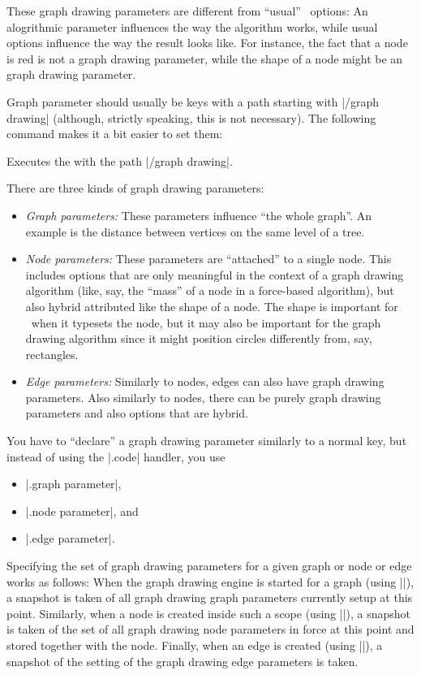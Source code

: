 These graph drawing parameters are different from ``usual'' \pgfname\
options: An alogrithmic parameter influences the way the algorithm
works, while usual options influence the way the result
looks like. For instance, the fact that a node is red is not a
graph drawing parameter, while the shape of a node might be an graph
drawing parameter. 

Graph parameter should usually be keys with a path starting with
|/graph drawing| (although, strictly speaking, this is not
necessary). The following command makes it a bit easier to set them:
\begin{command}{\pgfgdset\marg{options}}
  Executes the  with the path |/graph drawing|.  
\end{command}

There are three kinds of graph drawing parameters:

\begin{itemize}
\item \emph{Graph parameters:}
  These parameters influence ``the whole graph''. An example
  is the distance between vertices on the same level of a tree.
\item \emph{Node parameters:}
  These parameters are ``attached'' to a single node. This includes
  options that are only meaningful in the context of a graph
  drawing algorithm (like, say, the ``mass'' of a node in a
  force-based algorithm), but also hybrid attributed like the shape
  of a node. The shape is important for \pgfname\ when it typesets the 
  node, but it may also be important for the graph drawing
  algorithm since it might position circles differently from, say,
  rectangles.
\item \emph{Edge parameters:}
  Similarly to nodes, edges can also have graph drawing
  parameters. Also similarly to nodes, there can be purely
  graph drawing parameters and also options that are hybrid.
\end{itemize}
   
You have to ``declare'' a graph drawing parameter similarly to a
normal key, but instead of using the |.code| handler, you use
\begin{itemize}
\item |.graph parameter|,
\item |.node parameter|, and
\item |.edge parameter|.
\end{itemize}

Specifying the set of graph drawing parameters for a given graph or
node or edge works as follows: When the graph drawing engine is
started for a graph (using |\pgfgdbeginscope|), a snapshot is taken of
all graph drawing graph parameters currently setup at this
point. Similarly, when a node is created inside such a scope (using
|\pgfnode|), a snapshot is taken of the set of all graph drawing node
parameters in force at this point and stored together with
the node. Finally, when an edge is created (using |\pgfgdedge|), a
snapshot of the setting of the graph drawing edge parameters is
taken. 

